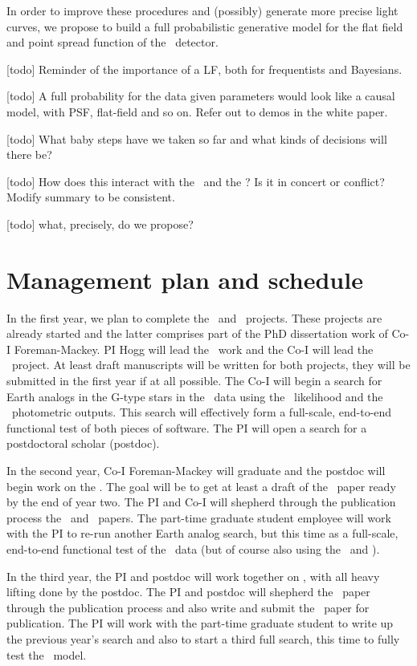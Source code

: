 \documentclass[letterpaper,12pt,preprint]{hack_aastex}
\begin{document}
In order to improve these procedures and (possibly) generate more precise
light curves, we propose to build a full probabilistic generative model for
the flat field and point spread function of the \Kepler\ detector.


[todo] Reminder of the importance of a LF, both for frequentists and Bayesians.

[todo] A full probability for the data given parameters would look like a causal model, with PSF, flat-field and so on.  Refer out to demos in the white paper.

[todo] What baby steps have we taken so far and what kinds of decisions will there be?

[todo] How does this interact with the \PLM\ and the \OWL?  Is it in concert or conflict?  Modify summary to be consistent.

[todo] what, precisely, do we propose?

\section{Management plan and schedule}

In the first year, we plan to complete the \OWL\ and \George\ projects.
These projects are already started and the latter comprises part of the PhD
dissertation work of Co-I Foreman-Mackey.
PI Hogg will lead the \OWL\ work and the Co-I will lead the \George\ project.
At least draft manuscripts will be written for both projects, they will
be submitted in the first year if at all possible.
The Co-I will begin a search for Earth analogs in the G-type stars in the
\Kepler\ data using the \George\ likelihood and the \OWL\ photometric outputs.
This search will effectively form a full-scale, end-to-end functional test of
both pieces of software.
The PI will open a search for a postdoctoral scholar (postdoc).

In the second year, Co-I Foreman-Mackey will graduate and the postdoc will
begin work on the \PLM.
The goal will be to get at least a draft of the \PLM\ paper ready by the end
of year two.
The PI and Co-I will shepherd through the publication process the \OWL\ and
\George\ papers.
The part-time graduate student employee will work with the PI to
re-run another Earth analog search, but this time
as a full-scale, end-to-end functional test of the \PLM\ data (but of course
also using the \OWL\ and \George).

In the third year, the PI and postdoc will work together on \kpsf, with all
heavy lifting done by the postdoc.
The PI and postdoc will shepherd the \PLM\ paper through the publication
process and also write and submit the \kpsf\ paper for publication.
The PI will work with the part-time graduate student to write up the previous
year's search and also to start a third full search, this time to
fully test the \kpsf\ model.
\end{document}

